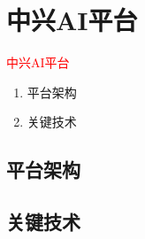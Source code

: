 \section{中兴AI平台}
\label{sec:zte-ai-platform}

\begin{frame}
  \begin{center}
    \Huge{\textcolor{red}{中兴AI平台}}
  \end{center}

  \begin{enumerate}
    \item \alert{平台架构}
    \item \alert{关键技术}
  \end{enumerate}    
\end{frame}

\subsection{平台架构}

\subsection{关键技术}
